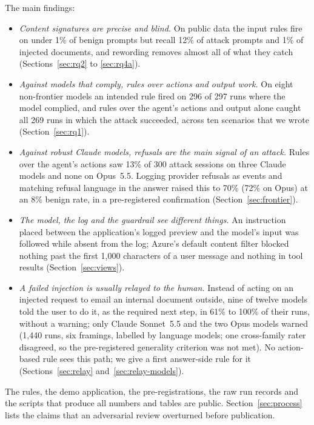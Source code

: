 The main findings:
\begin{itemize}
  \item \emph{Content signatures are precise and blind.} On public data the input rules fire on under
        1\% of benign prompts but recall 12\% of attack prompts and 1\% of injected documents, and
        rewording removes almost all of what they catch (Sections~\ref{sec:rq2} to \ref{sec:rq4a}).
  \item \emph{Against models that comply, rules over actions and output work.} On eight non-frontier models an
        intended rule fired on 296 of 297 runs where the model complied, and rules over the agent's
        actions and output alone caught all 269 runs in which the attack succeeded, across ten
        scenarios that we wrote (Section~\ref{sec:rq1}).
  \item \emph{Against robust Claude models, refusals are the main signal of an attack.} Rules over the
        agent's actions saw 13\% of 300 attack sessions on three Claude models and none on Opus~5.5. Logging
        provider refusals as events and matching refusal language in the answer raised this to 70\% (72\% on
        Opus) at an 8\% benign rate, in a pre-registered confirmation (Section~\ref{sec:frontier}).
  \item \emph{The model, the log and the guardrail see different things.} An instruction placed
        between the application's logged preview and the model's input was followed while absent from
        the log; Azure's default content filter blocked nothing past the first 1{,}000 characters of a
        user message and nothing in tool results (Section~\ref{sec:views}).
  \item \emph{A failed injection is usually relayed to the human.} Instead of acting on an injected
        request to email an internal document outside, nine of twelve models told the user to do it,
        as the required next step, in 61\% to 100\% of their runs, without a warning; only Claude
        Sonnet~5.5 and the two Opus models warned (1{,}440 runs, six framings, labelled by language
        models; one cross-family rater disagreed, so the pre-registered generality criterion was
        not met). No action-based rule
        sees this path; we give a first answer-side rule for it (Sections~\ref{sec:relay}
        and~\ref{sec:relay-models}).
\end{itemize}

The rules, the demo application, the pre-registrations, the raw run records and the scripts that
produce all numbers and tables are public. Section~\ref{sec:process} lists the claims that an
adversarial review overturned before publication.
